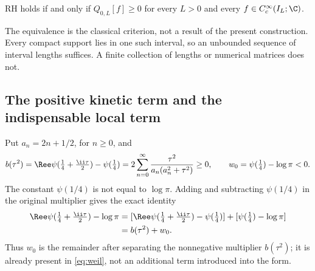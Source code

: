 \begin{theorem}\label{thm:weil}
RH holds if and only if $Q_{0,L}[f]\geq0$ for every $L>0$ and every
$f\in C_c^\infty(I_L;\C)$.
\end{theorem}
The equivalence is the classical criterion, not a result of the present
construction. Every compact support lies in one such interval, so an
unbounded sequence of interval lengths suffices. A finite collection of
lengths or numerical matrices does not.

\subsection{The positive kinetic term and the indispensable local term}

Put $a_n=2n+1/2$, for $n\geq0$, and
\begin{equation}\label{eq:b-symbol}
 b(\tau^2)=\Ree\psi(\tfrac14+\tfrac{\ii\tau}2)-\psi(\tfrac14)
 =2\sum_{n=0}^\infty\frac{\tau^2}{a_n(a_n^2+\tau^2)}\geq0,
 \qquad w_0=\psi(\tfrac14)-\log\pi<0.
\end{equation}
The constant $\psi(1/4)$ is not equal to $\log\pi$. Adding and
subtracting $\psi(1/4)$ in the original multiplier gives the exact identity
\begin{align}\label{eq:archimedean-split}
 \Ree\psi(\tfrac14+\tfrac{\ii\tau}2)-\log\pi
 &=[\Ree\psi(\tfrac14+\tfrac{\ii\tau}2)-\psi(\tfrac14)]
   +[\psi(\tfrac14)-\log\pi]\notag\\
 &=b(\tau^2)+w_0.
\end{align}
Thus $w_0$ is the remainder after separating the nonnegative multiplier
$b(\tau^2)$; it is already present in \eqref{eq:weil}, not an additional
term introduced into the form.

